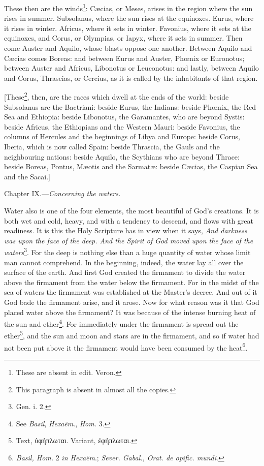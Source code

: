 These then are the winds\footnote{These are absent in edit. Veron.}: Cæcias, or Meses, arises in the region where the sun rises in summer. Subsolanus, where the sun rises at the equinoxes. Eurus, where it rises in winter. Africus, where it sets in winter. Favonius, where it sets at the equinoxes, and Corus, or Olympias, or Iapyx, where it sets in summer. Then come Auster and Aquilo, whose blasts oppose one another. Between Aquilo and Cæcias comes Boreas: and between Eurus and Auster, Phœnix or Euronotus; between Auster and Africus, Libonotus or Leuconotus: and lastly, between Aquilo and Corus, Thrascias, or Cercius, as it is called by the inhabitants of that region.

[These\footnote{This paragraph is absent in almost all the copies.}, then, are the races which dwell at the ends of the world: beside Subsolanus are the Bactriani: beside Eurus, the Indians: beside Phœnix, the Red Sea and Ethiopia: beside Libonotus, the Garamantes, who are beyond Systis: beside Africus, the Ethiopians and the Western Mauri: beside Favonius, the columns of Hercules and the beginnings of Libya and Europe: beside Corus, Iberia, which is now called Spain: beside Thrascia, the Gauls and the neighbouring nations: beside Aquilo, the Scythians who are beyond Thrace: beside Boreas, Pontus, Mæotis and the Sarmatæ: beside Cæcias, the Caspian Sea and the Sacai.]


Chapter IX.—\emph{Concerning the waters.}

Water also is one of the four elements, the most beautiful of God’s creations. It is both wet and cold, heavy, and with a tendency to descend, and flows with great readiness. It is this the Holy Scripture has in view when it says, \emph{And darkness was upon the face of the deep. And the Spirit of God moved upon the face of the waters}\footnote{Gen. i. 2.}. For the deep is nothing else than a huge quantity of water whose limit man cannot comprehend. In the beginning, indeed, the water lay all over the surface of the earth. And first God created the firmament to divide the water above the firmament from the water below the firmament. For in the midst of the sea of waters the firmament was established at the Master’s decree. And out of it God bade the firmament arise, and it arose. Now for what reason was it that God placed water above the firmament? It was because of the intense burning heat of the sun and ether\footnote{See \emph{Basil}, \emph{Hexaëm}., \emph{Hom. }3.}. For immediately under the firmament is spread out the ether\footnote{Text, \textgreek{ὑφήπλωται}. Variant, \textgreek{ἐφήπλωται}.}, and the sun and moon and stars are in the firmament, and so if water had not been put above it the firmament would have been consumed by the heat\footnote{\emph{Basil, Hom.} 2 \emph{in Hexaëm}.; \emph{Sever. Gabal., Orat. de opific. mundi}.}.

